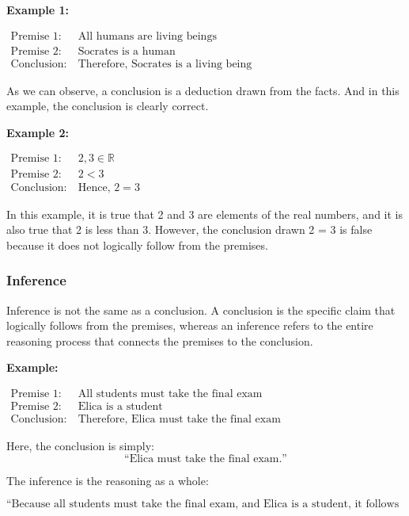 \documentclass[12pt,a4paper,openany]{article}
\begin{document}
\textbf{Example 1:} 

$
\begin{aligned}
\text{Premise 1:} \ & \text{All humans are living beings} \\
\text{Premise 2:} \ & \text{Socrates is a human} \\
\text{Conclusion:} \ & \text{Therefore, Socrates is a living being}
\end{aligned}
$

As we can observe, a conclusion is a deduction drawn from the facts. And in this example, the conclusion is clearly correct.

\textbf{Example 2:}  

$
\begin{aligned}
\text{Premise 1:} \ & 2, 3 \in \mathbb{R} \\
\text{Premise 2:} \ & 2 < 3 \\
\text{Conclusion:} \ & \text{Hence, } 2 = 3
\end{aligned}
$


In this example, it is true that 2 and 3 are elements of the real numbers, and it is also true that 2 is less than 3. However, the conclusion drawn 2 = 3 is false because it does not logically follow from the premises.

\subsubsection{Inference}

Inference is not the same as a conclusion. A conclusion is the specific claim that logically follows from the premises, whereas an inference refers to the entire reasoning process that connects the premises to the conclusion.  

\textbf{Example:}  

$
\begin{aligned}
\text{Premise 1:} \ & \text{All students must take the final exam} \\
\text{Premise 2:} \ & \text{Elica is a student} \\
\text{Conclusion:} \ & \text{Therefore, Elica must take the final exam}
\end{aligned}
$


Here, the conclusion is simply:  
$$\text{“Elica must take the final exam.”}$$

The inference is the reasoning as a whole:

$$\text{“Because all students must take the final exam, and Elica is a student, it follows that Elica must take the final exam.”}$$
\end{document}
